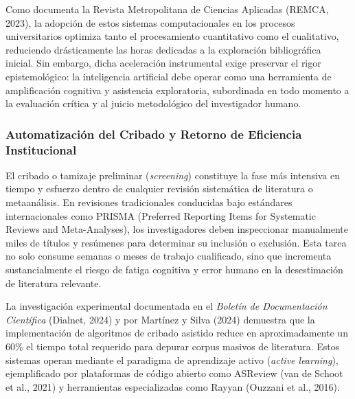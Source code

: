 Como documenta la Revista Metropolitana de Ciencias Aplicadas (REMCA, 2023), la adopción de estos sistemas computacionales en los procesos universitarios optimiza tanto el procesamiento cuantitativo como el cualitativo, reduciendo drásticamente las horas dedicadas a la exploración bibliográfica inicial. Sin embargo, dicha aceleración instrumental exige preservar el rigor epistemológico: la inteligencia artificial debe operar como una herramienta de amplificación cognitiva y asistencia exploratoria, subordinada en todo momento a la evaluación crítica y al juicio metodológico del investigador humano.

\subsubsection{Automatización del Cribado y Retorno de Eficiencia Institucional}

El cribado o tamizaje preliminar (\textit{screening}) constituye la fase más intensiva en tiempo y esfuerzo dentro de cualquier revisión sistemática de literatura o metaanálisis. En revisiones tradicionales conducidas bajo estándares internacionales como PRISMA (Preferred Reporting Items for Systematic Reviews and Meta-Analyses), los investigadores deben inspeccionar manualmente miles de títulos y resúmenes para determinar su inclusión o exclusión. Esta tarea no solo consume semanas o meses de trabajo cualificado, sino que incrementa sustancialmente el riesgo de fatiga cognitiva y error humano en la desestimación de literatura relevante.

La investigación experimental documentada en el \textit{Boletín de Documentación Científica} (Dialnet, 2024) y por Martínez y Silva (2024) demuestra que la implementación de algoritmos de cribado asistido reduce en aproximadamente un 60\% el tiempo total requerido para depurar corpus masivos de literatura. Estos sistemas operan mediante el paradigma de aprendizaje activo (\textit{active learning}), ejemplificado por plataformas de código abierto como ASReview (van de Schoot et al., 2021) y herramientas especializadas como Rayyan (Ouzzani et al., 2016).

